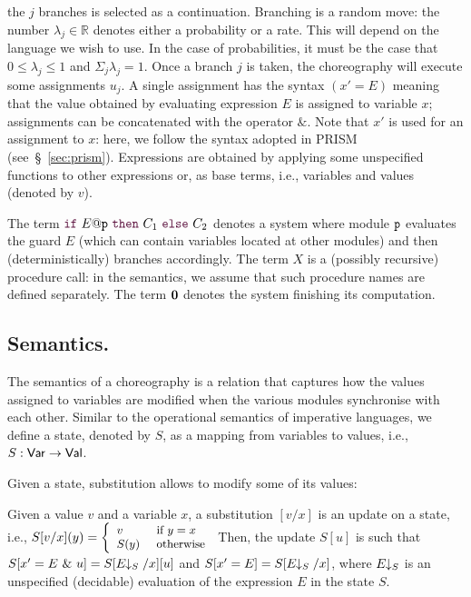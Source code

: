 the $j$ branches is selected as a continuation. Branching is a random
move: the number $\lambda_j\in\mathbb R$ denotes either a probability
or a rate. This will depend on the language we wish to use. In the
case of probabilities, it must be the case that $0\leq\lambda_j\leq 1$
and $\Sigma_j\lambda_j=1$. Once a branch $j$ is taken, the
choreography will execute some assignments $u_j$. A single assignment
has the syntax $(x' = E)$ meaning that the value obtained by
evaluating expression $E$ is assigned to variable $x$; assignments can
be concatenated with the operator $\&$.  Note that $x'$ is used for an
assignment to $x$: here, we follow the syntax adopted in PRISM
(see~\S~\ref{sec:prism}). Expressions are obtained by applying some
unspecified functions to other expressions or, as base terms, i.e.,
variables and values (denoted by $v$).
%

The term $\ifTE {E}{p}{C_1}{C_2}$ denotes a system where module
  $\mathtt{p}$ evaluates the guard $E$ (which can contain variables
  located at other modules) and then (deterministically) branches
  accordingly.  The term $X$ is a (possibly recursive) procedure call:
  in the semantics, we assume that such procedure names are defined
  separately.  The term $\mathbf{0}$ denotes the system finishing its
  computation.

\bigskip


\subsection{Semantics.} The semantics of a choreography is a relation
that captures how the values assigned to variables are modified when
the various modules synchronise with each other. Similar to the
operational semantics of imperative languages, we define a state,
denoted by $S$, as a mapping from variables to values, i.e.,
$S: \mathsf{Var} \rightarrow\mathsf{Val}$.
%

Given a state, substitution allows to modify some of its values:
  \begin{definition}
  Given a value $v$ and a variable $x$, a substitution $[v/x]$ is an
  update on a state, i.e., $\small S[v/x] (y)= \left\{
  \begin{array}{ll} 
    v    & \text{ if } y=x\\ 
    S(y) & \text{ otherwise}
  \end{array} \right.
$
Then, the update $S[u]$ is such that
$S[x'=E\ \&\ u] = S[E\!\!\downarrow_{S}/x][u]$ and $S[x'=E] = S[E\!\!\downarrow_{S}/x]$,
where $E\!\!\downarrow_{S}$ is an unspecified (decidable) evaluation of the
expression $E$ in the state $S$.
\end{definition}


